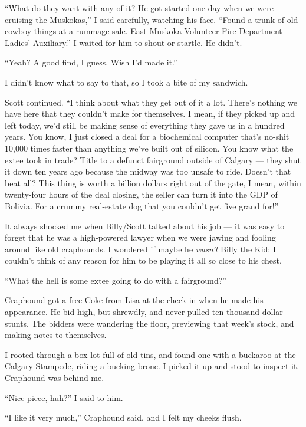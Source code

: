 ``What do they want with any of it? He got started one day when 
we were cruising the Muskokas,''
I said carefully, watching his face.
``Found a trunk of old cowboy things at a rummage sale. East 
Muskoka Volunteer Fire Department Ladies' Auxiliary.''
I waited for him to shout or startle. He didn't.

``Yeah? A good find, I guess. Wish I'd made it.''

I didn't know what to say to that, so I took a bite of my
sandwich.

Scott continued.
``I think about what they get out of it a lot. There's nothing we have 
here that they couldn't make for themselves. I mean, if they picked 
up and left today, we'd still be making sense of everything they 
gave us in a hundred years. You know, I just closed a deal for a 
biochemical computer that's no-shit 10,000 times faster than 
anything we've built out of silicon. You know what the extee took 
in trade? Title to a defunct fairground outside of Calgary --- they 
shut it down ten years ago because the midway was too unsafe to ride. 
Doesn't that beat all? This thing is worth a billion dollars right 
out of the gate, I mean, within twenty-four hours of the deal closing, 
the seller can turn it into the GDP of Bolivia. For a crummy 
real-estate dog that you couldn't get five grand for!''

It always shocked me when Billy/Scott talked about his job --- it
was easy to forget that he was a high-powered lawyer when we were
jawing and fooling around like old craphounds. I wondered if maybe
he \emph{wasn't} Billy the Kid; I couldn't think of any reason for
him to be playing it all so close to his chest.

``What the hell is some extee going to do with a fairground?''

\tb

Craphound got a free Coke from Lisa at the check-in when he made
his appearance. He bid high, but shrewdly, and never pulled
ten-thousand-dollar stunts. The bidders were wandering the floor,
previewing that week's stock, and making notes to themselves.

I rooted through a box-lot full of old tins, and found one with a
buckaroo at the Calgary Stampede, riding a bucking bronc. I picked
it up and stood to inspect it. Craphound was behind me.

``Nice piece, huh?'' I said to him.

``I like it very much,'' Craphound said, and I felt my cheeks
flush.

